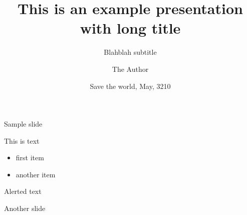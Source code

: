 \documentclass[aspectratio=169,smaller,t]{beamer}
\begin{document}
\title[Example presentation]{This is an example presentation with long title}
\subtitle{Blahblah subtitle}
\author{The Author}
\date{Save the world, May, 3210}

\begin{frame}[plain]
  \maketitle
\end{frame}

\begin{frame}
{Sample slide}

This is text
\begin{itemize}
\item first item
\item another item
\end{itemize}
\alert{Alerted text}
\end{frame}

\begin{frame}
{Another slide}
\lipsum[1]
\end{frame}

\begin{lastframe}
\end{lastframe}
\end{document}
